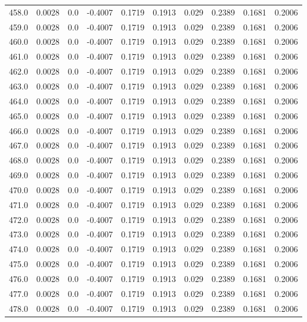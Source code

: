 \begin{longtable}{lrrrrrrrrr}
458.0 & 0.0028 & 0.0 & -0.4007 & 0.1719 & 0.1913 & 0.029 & 0.2389 & 0.1681 & 0.2006 \\
459.0 & 0.0028 & 0.0 & -0.4007 & 0.1719 & 0.1913 & 0.029 & 0.2389 & 0.1681 & 0.2006 \\
460.0 & 0.0028 & 0.0 & -0.4007 & 0.1719 & 0.1913 & 0.029 & 0.2389 & 0.1681 & 0.2006 \\
461.0 & 0.0028 & 0.0 & -0.4007 & 0.1719 & 0.1913 & 0.029 & 0.2389 & 0.1681 & 0.2006 \\
462.0 & 0.0028 & 0.0 & -0.4007 & 0.1719 & 0.1913 & 0.029 & 0.2389 & 0.1681 & 0.2006 \\
463.0 & 0.0028 & 0.0 & -0.4007 & 0.1719 & 0.1913 & 0.029 & 0.2389 & 0.1681 & 0.2006 \\
464.0 & 0.0028 & 0.0 & -0.4007 & 0.1719 & 0.1913 & 0.029 & 0.2389 & 0.1681 & 0.2006 \\
465.0 & 0.0028 & 0.0 & -0.4007 & 0.1719 & 0.1913 & 0.029 & 0.2389 & 0.1681 & 0.2006 \\
466.0 & 0.0028 & 0.0 & -0.4007 & 0.1719 & 0.1913 & 0.029 & 0.2389 & 0.1681 & 0.2006 \\
467.0 & 0.0028 & 0.0 & -0.4007 & 0.1719 & 0.1913 & 0.029 & 0.2389 & 0.1681 & 0.2006 \\
468.0 & 0.0028 & 0.0 & -0.4007 & 0.1719 & 0.1913 & 0.029 & 0.2389 & 0.1681 & 0.2006 \\
469.0 & 0.0028 & 0.0 & -0.4007 & 0.1719 & 0.1913 & 0.029 & 0.2389 & 0.1681 & 0.2006 \\
470.0 & 0.0028 & 0.0 & -0.4007 & 0.1719 & 0.1913 & 0.029 & 0.2389 & 0.1681 & 0.2006 \\
471.0 & 0.0028 & 0.0 & -0.4007 & 0.1719 & 0.1913 & 0.029 & 0.2389 & 0.1681 & 0.2006 \\
472.0 & 0.0028 & 0.0 & -0.4007 & 0.1719 & 0.1913 & 0.029 & 0.2389 & 0.1681 & 0.2006 \\
473.0 & 0.0028 & 0.0 & -0.4007 & 0.1719 & 0.1913 & 0.029 & 0.2389 & 0.1681 & 0.2006 \\
474.0 & 0.0028 & 0.0 & -0.4007 & 0.1719 & 0.1913 & 0.029 & 0.2389 & 0.1681 & 0.2006 \\
475.0 & 0.0028 & 0.0 & -0.4007 & 0.1719 & 0.1913 & 0.029 & 0.2389 & 0.1681 & 0.2006 \\
476.0 & 0.0028 & 0.0 & -0.4007 & 0.1719 & 0.1913 & 0.029 & 0.2389 & 0.1681 & 0.2006 \\
477.0 & 0.0028 & 0.0 & -0.4007 & 0.1719 & 0.1913 & 0.029 & 0.2389 & 0.1681 & 0.2006 \\
478.0 & 0.0028 & 0.0 & -0.4007 & 0.1719 & 0.1913 & 0.029 & 0.2389 & 0.1681 & 0.2006 \\

\end{longtable}
